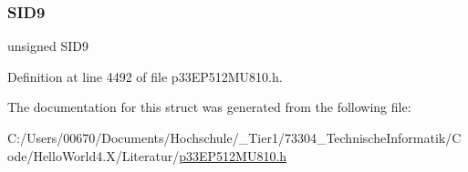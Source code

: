 \subsubsection{\texorpdfstring{S\+I\+D9}{SID9}}
{\footnotesize\ttfamily unsigned S\+I\+D9}



Definition at line 4492 of file p33\+E\+P512\+M\+U810.\+h.



The documentation for this struct was generated from the following file\+:\begin{DoxyCompactItemize}
\item 
C\+:/\+Users/00670/\+Documents/\+Hochschule/\+\_\+\+Tier1/73304\+\_\+\+Technische\+Informatik/\+Code/\+Hello\+World4.\+X/\+Literatur/\hyperlink{p33_e_p512_m_u810_8h}{p33\+E\+P512\+M\+U810.\+h}\end{DoxyCompactItemize}

